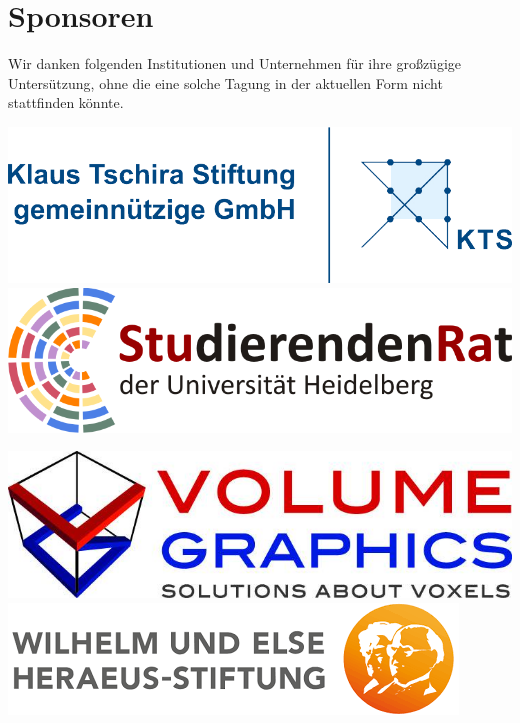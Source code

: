 
\pagebreak
\section{Sponsoren}
\small Wir danken folgenden Institutionen und Unternehmen für ihre großzügige Untersützung, ohne die eine solche Tagung in der aktuellen Form nicht stattfinden könnte.

\includegraphics[width=\textwidth]{media/ktslogo}
\centering\includegraphics[width=.9\textwidth]{media/StuRa}

\includegraphics[width=.48\textwidth]{media/volumegraphics}
\hfill
\includegraphics[width=.48\textwidth]{media/heraeus}

